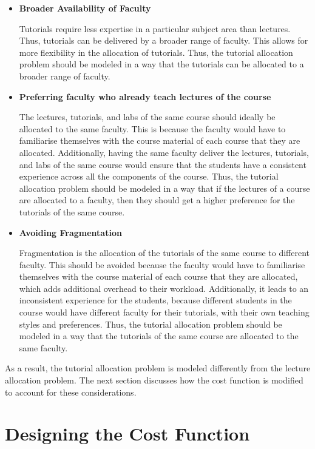 \begin{itemize}
  \item \textbf{Broader Availability of Faculty}

        Tutorials require less expertise in a particular subject area than lectures. Thus, tutorials can be delivered by a broader range of faculty. This allows for more flexibility in the allocation of tutorials. Thus, the tutorial allocation problem should be modeled in a way that the tutorials can be allocated to a broader range of faculty.

  \item \textbf{Preferring faculty who already teach lectures of the course}

        The lectures, tutorials, and labs of the same course should ideally be allocated to the same faculty. This is because the faculty would have to familiarise themselves with the course material of each course that they are allocated. Additionally, having the same faculty deliver the lectures, tutorials, and labs of the same course would ensure that the students have a consistent experience across all the components of the course. Thus, the tutorial allocation problem should be modeled in a way that if the lectures of a course are allocated to a faculty, then they should get a higher preference for the tutorials of the same course.

  \item \textbf{Avoiding Fragmentation}

        Fragmentation is the allocation of the tutorials of the same course to different faculty. This should be avoided because the faculty would have to familiarise themselves with the course material of each course that they are allocated, which adds additional overhead to their workload. Additionally, it leads to an inconsistent experience for the students, because different students in the course would have different faculty for their tutorials, with their own teaching styles and preferences. Thus, the tutorial allocation problem should be modeled in a way that the tutorials of the same course are allocated to the same faculty.

\end{itemize}

As a result, the tutorial allocation problem is modeled differently from the lecture allocation problem. The next section discusses how the cost function is modified to account for these considerations.

\section{Designing the Cost Function}

